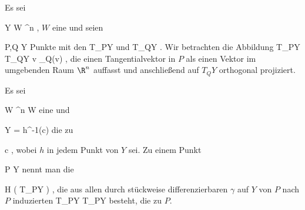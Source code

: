 {}
{

Es sei

\mavergleichskette
{\vergleichskette
{ Y
}
{ \subseteq }{ W
}
{ \subseteq }{ \R^n
}
{    }{
}
{   }{
}
}
{}{}{,}
$W$
eine
und seien

\mavergleichskette
{\vergleichskette
{ P,Q
}
{ \in }{ Y
}
{  }{
}
{    }{
}
{   }{
}
}
{}{}{}
Punkte mit den
\mathkor {} {T_PY} {und} {T_QY} {.}
Wir betrachten die Abbildung
 {T_PY} { T_QY
} { v } { \pi_Q(v)
} {,}
die einen Tangentialvektor in $P$ als einen Vektor im umgebenden Raum $\R^n$ auffasst und anschließend auf $T_QY$ orthogonal projiziert.

}
{} {}

Es sei

\mavergleichskette
{\vergleichskette
{ W
}
{ \subseteq }{ \R^n
}
{  }{
}
{    }{
}
{   }{
}
}
{}{}{}
 { W } { \R
} {}
eine
und

\mavergleichskette
{\vergleichskette
{ Y
}
{ = }{ h^{-1}(c)
}
{  }{
}
{    }{
}
{   }{
}
}
{}{}{}
die
zu

\mavergleichskette
{\vergleichskette
{ c
}
{ \in }{ \R
}
{  }{
}
{    }{
}
{   }{
}
}
{}{}{,}
wobei $h$ in jedem Punkt von $Y$
sei. Zu einem Punkt

\mavergleichskette
{\vergleichskette
{ P
}
{ \in }{ Y
}
{  }{
}
{    }{
}
{   }{
}
}
{}{}{}
nennt man die

\mavergleichskette
{\vergleichskette
{ H
}
{ \subseteq }{  \left(  T_PY  \right)
}
{  }{
}
{    }{
}
{   }{
}
}
{}{}{,}
die aus allen durch stückweise differenzierbaren
$\gamma$ auf $Y$ von $P$ nach $P$ induzierten
\maabbdisp {\Psi_\gamma} {T_PY} {T_PY
} {}
besteht, die
zu $P$.

